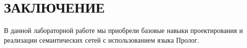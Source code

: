 \section*{ЗАКЛЮЧЕНИЕ}

В данной лабораторной работе мы приобрели базовые навыки проектирования
и реализации семантических сетей с использованием языка Пролог.

\newpage